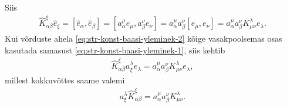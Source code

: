 Siis
\begin{align}\label{eq:str-konst-baasi-yleminek-2}
    \hat{K}_{\alpha \beta}^{\xi} \hat{e}_\xi = 
    [\hat{e}_\alpha, \hat{e}_\beta] =
    [a_\alpha^\mu e_\mu, a_\beta^\nu e_\nu] =
    a_\alpha^\mu a_\beta^\nu [e_\mu, e_\nu] =
    a_\alpha^\mu a_\beta^\nu K_{\mu \nu}^{\lambda} e_\lambda.
\end{align}
Kui võrduste ahela \eqref{eq:str-konst-baasi-yleminek-2} kõige
vasakpoolsemas osas kasutada samasust
\eqref{eq:str-konst-baasi-yleminek-1}, siis kehtib
\begin{align*}
    \hat{K}_{\alpha \beta}^{\xi} a_\xi^\lambda e_\lambda =
    a_\alpha^\mu a_\beta^\nu K_{\mu \nu}^{\lambda} e_\lambda,
\end{align*}
millest kokkuvõttes saame valemi
\begin{align*}
    a_\xi^\lambda \hat{K}_{\alpha \beta}^{\xi} =
    a_\alpha^\mu a_\beta^\nu K_{\mu \nu}^{\lambda}.
\end{align*}